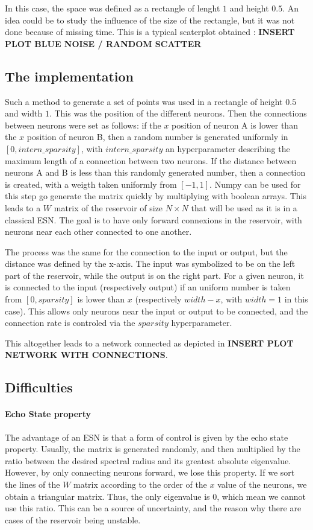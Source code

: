 \documentclass[11pt]{article}
\begin{document}
      In this case, the space was defined as a rectangle of lenght $1$ and height $0.5$. An idea could be to study the influence of the size of the rectangle, but it was not done because of missing time. This is a typical scaterplot obtained : \textbf{INSERT PLOT BLUE NOISE / RANDOM SCATTER}

  \subsection{The implementation}
    Such a method to generate a set of points was used in a rectangle of height $0.5$ and width $1$. This was the position of the different neurons. Then the connections between neurons were set as follows: if the $x$ position of neuron A is lower than the $x$ position of neuron B, then a random number is generated uniformly in $[0,intern\_sparsity]$, with $intern\_sparsity$ an hyperparameter describing the maximum length of a connection between two neurons. If the distance between neurons A and B is less than this randomly generated number, then a connection is created, with a weigth taken uniformly from $[-1,1]$. Numpy can be used for this step go generate the matrix quickly by multiplying with boolean arrays. This leads to a $W$ matrix of the reservoir of size $N\times N$ that will be used as it is in a classical ESN. The goal is to have only forward connexions in the reservoir, with neurons near each other connected to one another.

    The process was the same for the connection to the input or output, but the distance was defined by the x-axis. The input was symbolized to be on the left part of the reservoir, while the output is on the right part. For a given neuron, it is connected to the input (respectively output) if an uniform number is taken from $[0,sparsity]$ is lower than $x$ (respectively $width-x$, with $width = 1$ in this case). This allows only neurons near the input or output to be connected, and the connection rate is controled via the $sparsity$ hyperparameter.

    This altogether leads to a network connected as depicted in \textbf{INSERT PLOT NETWORK WITH CONNECTIONS}.



  \subsection{Difficulties}
    \paragraph{Echo State property}
      The advantage of an ESN is that a form of control is given by the echo state property. Usually, the matrix is generated randomly, and then multiplied by the ratio between the desired spectral radius and its greatest absolute eigenvalue. However, by only connecting neurons forward, we lose this property. If we sort the lines of the $W$ matrix according to the order of the $x$ value of the neurons, we obtain a triangular matrix. Thus, the only eigenvalue is $0$, which mean we cannot use this ratio. This can be a source of uncertainty, and the reason why there are cases of the reservoir being unstable.
\end{document}

